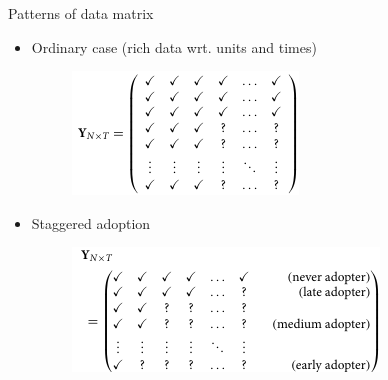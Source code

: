 \documentclass[xcolor=svgnames,aspectratio=169]{beamer}
\begin{document}
\begin{frame}{Patterns of data matrix}
    \begin{itemize}
        \item Ordinary case (rich data wrt. units and times)
        \begin{figure}
            \includegraphics[width=\textwidth, height=0.35\textheight, keepaspectratio]{Ordinary.png}
        \end{figure}
        \item Staggered adoption
        \begin{figure}
            \includegraphics[width=\textwidth, height=0.35\textheight, keepaspectratio]{Staggered_adoption.png}
        \end{figure}
    \end{itemize}
\end{frame}
\end{document}

